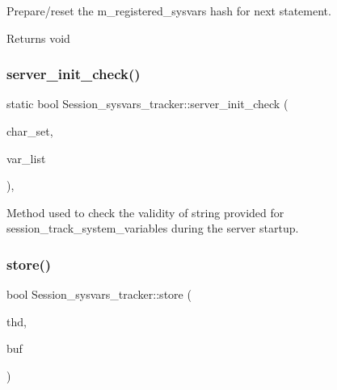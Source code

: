 Prepare/reset the m\+\_\+registered\+\_\+sysvars hash for next statement. 

\begin{DoxyReturn}{Returns}
void 
\end{DoxyReturn}
\mbox{\label{classSession__sysvars__tracker_a53ed673ab98982fd3dd55dea54d0b61c}} 
\subsubsection{\texorpdfstring{server\+\_\+init\+\_\+check()}{server\_init\_check()}}
{\footnotesize\ttfamily static bool Session\+\_\+sysvars\+\_\+tracker\+::server\+\_\+init\+\_\+check (\begin{DoxyParamCaption}\item[{const C\+H\+A\+R\+S\+E\+T\+\_\+\+I\+N\+FO $\ast$}]{char\+\_\+set,  }\item[{L\+E\+X\+\_\+\+S\+T\+R\+I\+NG}]{var\+\_\+list }\end{DoxyParamCaption})\hspace{0.3cm}{\ttfamily [inline]}, {\ttfamily [static]}}

Method used to check the validity of string provided for session\+\_\+track\+\_\+system\+\_\+variables during the server startup. \mbox{\label{classSession__sysvars__tracker_a518ef2f3fae3c779cf182a391683b22e}} 
\subsubsection{\texorpdfstring{store()}{store()}}
{\footnotesize\ttfamily bool Session\+\_\+sysvars\+\_\+tracker\+::store (\begin{DoxyParamCaption}\item[{T\+HD $\ast$}]{thd,  }\item[{String \&}]{buf }\end{DoxyParamCaption})\hspace{0.3cm}{\ttfamily [virtual]}}



